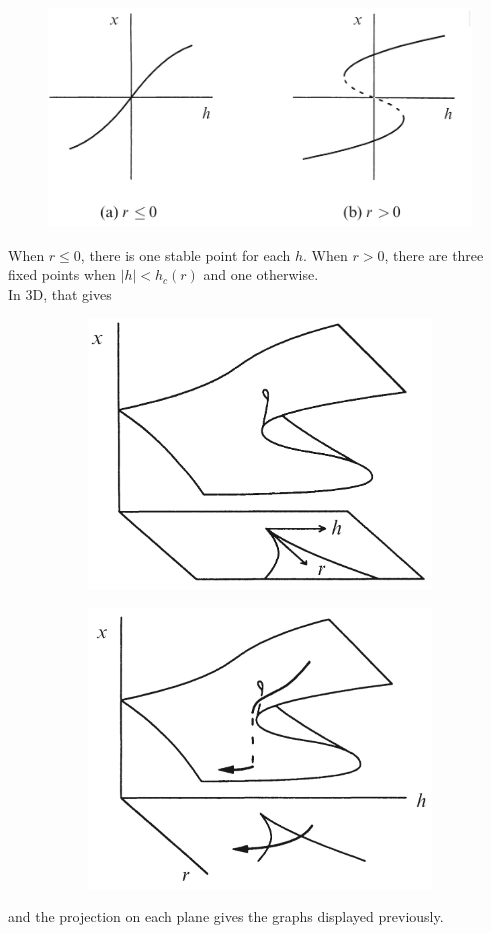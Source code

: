 \documentclass[12pt, openany]{report}
\theoremstyle{definition}
\begin{document}
\begin{figure}[H]
    \centering
    \includegraphics[width=.5\textwidth]{img/r_analysis.png}
\end{figure}
When $r\le 0$, there is one stable point for each $h$. When $r>0$, there are three fixed points when $|h|<h_c(r)$ and one otherwise. \\
In 3D, that gives 
\begin{figure}[H]
    \centering
    \begin{subfigure}[b]{0.49\textwidth}
        \centering
        \includegraphics[width=\textwidth]{img/cusp_cata.png}
    \end{subfigure}
    \begin{subfigure}[b]{0.5\textwidth}
        \centering
        \includegraphics[width=\textwidth]{img/cusp_cata_2.png}
    \end{subfigure}
\end{figure}
and the projection on each plane gives the graphs displayed previously. 
\end{document}
